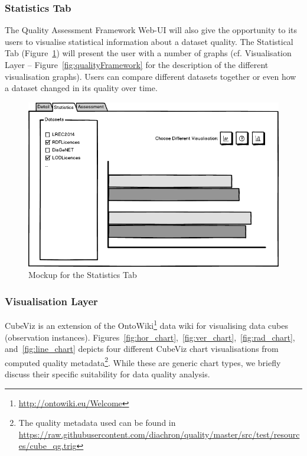\subsubsection{Statistics Tab}
The Quality Assessment Framework Web-UI will also give the opportunity to its users to visualise statistical information about a dataset quality.
The Statistical Tab (Figure~\ref{fig:uiStatisticsTab}) will present the user with a number of graphs (cf. Visualisation Layer – Figure~\ref{fig:qualityFramework} for the description of the different visualisation graphs).
Users can compare different datasets together or even how a dataset changed in its quality over time.

\begin{figure}[tbph]
\center
\includegraphics[width=\textwidth]{images/uiStatisticsTab.png} 
\caption{Mockup for the Statistics Tab} 
\label{fig:uiStatisticsTab}
\end{figure}

\subsubsection{Visualisation Layer}
\label{sec:vislayer_hla}
CubeViz is an extension of the OntoWiki\footnote{\url{http://ontowiki.eu/Welcome}} data wiki for visualising data cubes (observation instances).
Figures~\ref{fig:hor_chart},~\ref{fig:ver_chart},~\ref{fig:rad_chart}, and~\ref{fig:line_chart} depicts four different CubeViz chart visualisations from computed quality metadata\footnote{The quality metadata used can be found in \url{https://raw.githubusercontent.com/diachron/quality/master/src/test/resources/cube_qg.trig}}.  While these are generic chart types, we briefly discuss their specific suitability for data quality analysis.

